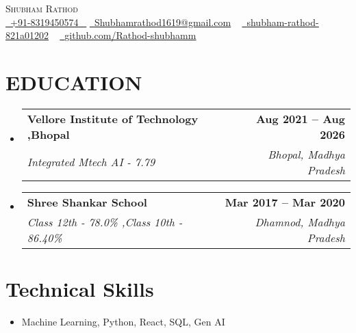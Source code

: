 \documentclass[letterpaper,11pt]{article}
\makeatletter
\newcommand{\resumeSubheading}[4]{
  \vspace{-2pt}\item
    \begin{tabular*}{1.0\textwidth}[t]{l@{\extracolsep{\fill}}r}
      \textbf{\large#1} & \textbf{\small #2} \\
      \textit{\large#3} & \textit{\small #4} \\
      
    \end{tabular*}\vspace{-7pt}
}
\newcommand{\resumeSubHeadingListStart}{\begin{itemize}[leftmargin=0.0in, label={}]}
\newcommand{\resumeSubHeadingListEnd}{\end{itemize}}
\makeatother
\begin{document}


\begin{center}
    {\Huge \scshape Shubham Rathod} \\ \vspace{1pt}
    \small \href{tel:+8319450574}{ \raisebox{-0.1\height}\faPhone\ \underline{+91-8319450574} ~} \href{mailto:Shubhamrathod1619@gmail.com}{\raisebox{-0.2\height}\faEnvelope\  \underline{Shubhamrathod1619@gmail.com}} ~ 
    \href{http://www.linkedin.com/in/shubham-rathod-821a01202/}{\raisebox{-0.2\height}\faLinkedinSquare\ \underline{shubham-rathod-821a01202}}  ~
    \href{https://github.com/Rathod-shubhamm}{\raisebox{-0.2\height}\faGithub\ \underline{github.com/Rathod-shubhamm}} ~
\end{center}


\section{EDUCATION}
  \resumeSubHeadingListStart
    \resumeSubheading
      {Vellore Institute of Technology ,Bhopal}{Aug 2021 -- Aug 2026}
      {Integrated Mtech AI - 7.79  }{Bhopal, Madhya Pradesh}
  \resumeSubHeadingListEnd
  
  \resumeSubHeadingListStart
    \resumeSubheading
      {Shree Shankar School }{Mar 2017 -- Mar 2020}
      {Class 12th  - {78.0\%}  ,Class 10th  - {86.40\%}}{Dhamnod, Madhya Pradesh}
  \resumeSubHeadingListEnd

\section{Technical Skills}
        \begin{multicols}{2}
            \begin{itemize}[itemsep=-2pt, parsep=5pt]
                \item Machine Learning, Python, React, SQL, Gen AI
                
                
            \end{itemize}
        \end{multicols}
        \vspace*{2.0\multicolsep}



\end{document}
